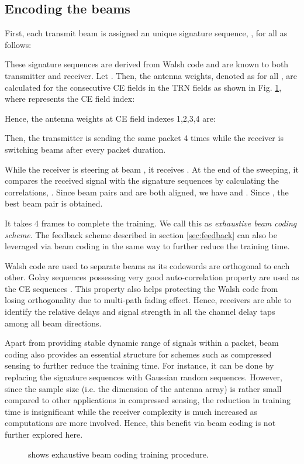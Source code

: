 \documentclass[10pt,conference]{IEEEtran}
\begin{document}
\subsection{Encoding the beams} \label{sec:beam_coding_tx}
First, each transmit beam  is assigned an unique signature sequence, ,
for all  as follows:
\begin{small}

\end{small}
These signature sequences are derived from Walsh code and are known to both
transmitter and
receiver. Let . Then, the antenna weights, denoted as  for all , are calculated for the consecutive CE fields in the TRN fields as shown in Fig. \ref{fig:beam_coding_full}, where  represents the CE field index:
\begin{small}

\end{small}
Hence, the antenna weights at CE field indexes 1,2,3,4 are:
\begin{small}

\end{small}
Then, the transmitter is sending the same packet 4 times while
the receiver is switching beams after every packet duration.

While the receiver is steering at beam , it receives . At the end of the
sweeping, it compares the received signal with the signature sequences by
calculating the correlations, .
Since beam pairs  and  are both aligned, we have 
and . Since , the best beam pair  is obtained.

It takes 4 frames to complete the training. We call this as
\emph{exhaustive beam coding scheme}. The feedback scheme described in section \ref{sec:feedback} can also be leveraged via beam coding in the same way to further reduce the training time.

Walsh code are used to separate beams as its codewords are orthogonal to each other. Golay sequences possessing very good auto-correlation property are used as the CE sequences \cite{IEEE80211ad}. This property also helps protecting the Walsh code from losing orthogonality due to multi-path fading effect. Hence, receivers are able to identify the relative delays and signal strength in all the channel delay taps among all beam directions.



Apart from providing stable dynamic range of signals within a packet, beam coding also provides an essential structure for schemes such as compressed sensing\cite{candes08} to further reduce the training time. For instance, it can be done by replacing the signature sequences with Gaussian random sequences. However, since the sample size (i.e. the dimension of the antenna array) is rather small compared to other applications in compressed sensing, the reduction in training time is insignificant while the receiver complexity is much increased as computations are more involved. Hence, this benefit via beam coding is not further explored here.
 \begin{figure}
 \centering
 \caption{shows exhaustive beam coding training procedure.}\label{fig:beam_coding_full}
 \end{figure}
\end{document}
